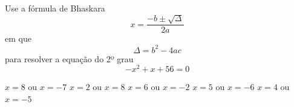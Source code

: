 Use a fórmula de Bhaskara
\[x=\frac{-b\pm\sqrt{\Delta}}{2a}\]
em que
\[\Delta=b^2-4ac\]
para resolver a equação do 2º grau
\[-x^2+x+56=0\]
\vspace{-7mm}

$x=8$ ou $x=-7$
$x=2$ ou $x=8$
$x=6$ ou $x=-2$
$x=5$ ou $x=-6$
$x=4$ ou $x=-5$



